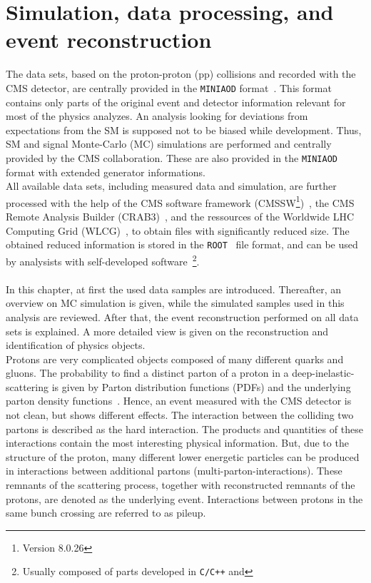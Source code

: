 \chapter{Simulation, data processing, and event reconstruction}\label{chap:reco}
The data sets, based on the proton-proton (pp) collisions and recorded with the CMS detector, are centrally provided in the \texttt{MINIAOD} format~\cite{MiniAOD}. This format contains only parts of the original event and detector information relevant for most of the physics analyzes. An analysis looking for deviations from expectations from the SM is supposed not to be biased while development. Thus, SM and signal Monte-Carlo (MC) simulations are performed and centrally provided by the CMS collaboration. These are also provided in the \texttt{MINIAOD} format with extended generator informations.\\
All available data sets, including measured data and simulation, are further processed with the help of the CMS software framework (CMSSW\footnote{Version 8.0.26})~\cite{CMSSW}, the CMS Remote Analysis Builder (CRAB3)~\cite{CRAB}, and the ressources of the Worldwide LHC Computing Grid (WLCG)~\cite{Grid}, to obtain files with significantly reduced size. The obtained reduced information is stored in the \texttt{ROOT}~\cite{ROOT} file format, and can be used by analysists with self-developed software~\footnote{Usually composed of parts developed in \texttt{C/C++} and }.\\
\\
In this chapter, at first the used data samples are introduced. Thereafter, an overview on MC simulation is given, while the simulated samples used in this analysis are reviewed. After that, the event reconstruction performed on all data sets is explained. A more detailed view is given on the reconstruction and identification of physics objects.\\
Protons are very complicated objects composed of many different quarks and gluons. The probability to find a distinct parton of a proton in a deep-inelastic-scattering is given by Parton distribution functions (PDFs) and the underlying parton density functions~\cite{PDF}. Hence, an event measured with the CMS detector is not clean, but shows different effects. The interaction between the colliding two partons is described as the hard interaction. The products and quantities of these interactions contain the most interesting physical information. But, due to the structure of the proton, many different lower energetic particles can be produced in interactions between additional partons (multi-parton-interactions). These remnants of the scattering process, together with reconstructed remnants of the protons, are denoted as the underlying event. Interactions between protons in the same bunch crossing are referred to as pileup.

